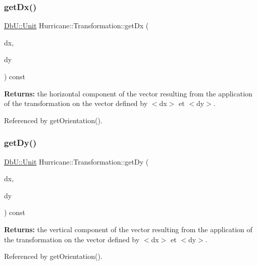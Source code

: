 \subsubsection{\texorpdfstring{get\+Dx()}{getDx()}}
{\footnotesize\ttfamily \hyperlink{group__DbUGroup_ga4fbfa3e8c89347af76c9628ea06c4146}{Db\+U\+::\+Unit} Hurricane\+::\+Transformation\+::get\+Dx (\begin{DoxyParamCaption}\item[{const \hyperlink{group__DbUGroup_ga4fbfa3e8c89347af76c9628ea06c4146}{Db\+U\+::\+Unit} \&}]{dx,  }\item[{const \hyperlink{group__DbUGroup_ga4fbfa3e8c89347af76c9628ea06c4146}{Db\+U\+::\+Unit} \&}]{dy }\end{DoxyParamCaption}) const}

{\bfseries Returns\+:} the horizontal component of the vector resulting from the application of the transformation on the vector defined by {\ttfamily $<$dx$>$} et {\ttfamily $<$dy$>$}. 

Referenced by get\+Orientation().

\mbox{\label{classHurricane_1_1Transformation_aa03354ff0a204e77863f392da8bb8678}} 
\subsubsection{\texorpdfstring{get\+Dy()}{getDy()}}
{\footnotesize\ttfamily \hyperlink{group__DbUGroup_ga4fbfa3e8c89347af76c9628ea06c4146}{Db\+U\+::\+Unit} Hurricane\+::\+Transformation\+::get\+Dy (\begin{DoxyParamCaption}\item[{const \hyperlink{group__DbUGroup_ga4fbfa3e8c89347af76c9628ea06c4146}{Db\+U\+::\+Unit} \&}]{dx,  }\item[{const \hyperlink{group__DbUGroup_ga4fbfa3e8c89347af76c9628ea06c4146}{Db\+U\+::\+Unit} \&}]{dy }\end{DoxyParamCaption}) const}

{\bfseries Returns\+:} the vertical component of the vector resulting from the application of the transformation on the vector defined by {\ttfamily $<$dx$>$} et {\ttfamily $<$dy$>$}. 

Referenced by get\+Orientation().

\mbox{\label{classHurricane_1_1Transformation_aea9a0f1d1ffeb4a38accbf0c9287a93f}} 
